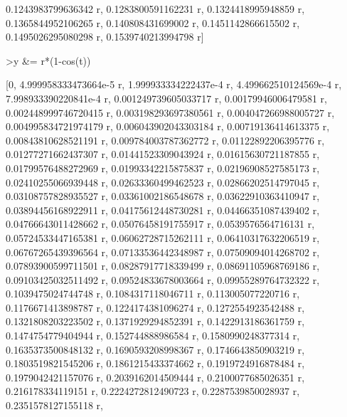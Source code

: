 \documentclass[12pt,arial,letterpaper]{book}
\begin{document}
\begin{eulernootebook}
\begin{eulercomment}
\begin{eulercomment}
\begin{eulernootebook}
\begin{eulercomment}
\begin{eulercomment}
\begin{eulercomment}
\begin{eulercomment}
\begin{eulercomment}
\begin{eulercomment}
\begin{eulernotebook}
\begin{eulercomment}
\begin{eulercomment}
\begin{eulercomment}
\begin{eulercomment}
\begin{eulercomment}
\begin{eulercomment}
\begin{eulercomment}
\begin{eulercomment}
\begin{eulercomment}
\begin{eulercomment}
\begin{eulercomment}
\begin{eulercomment}
\begin{eulercomment}
\begin{eulercomment}
\begin{eulercomment}
\begin{eulercomment}
\begin{euleroutput}
  0.1243983799636342 r, 0.1283800591162231 r, 0.1324418995948859 r, 
  0.1365844952106265 r, 0.140808431699002 r, 0.1451142866615502 r, 
  0.1495026295080298 r, 0.1539740213994798 r]
  
\end{euleroutput}
\begin{eulerprompt}
>y &= r*(1-cos(t))
\end{eulerprompt}
\begin{euleroutput}
  
          [0, 4.999958333473664e-5 r, 1.999933334222437e-4 r, 
  4.499662510124569e-4 r, 7.998933390220841e-4 r, 
  0.001249739605033717 r, 0.00179946006479581 r, 
  0.002448999746720415 r, 0.003198293697380561 r, 
  0.004047266988005727 r, 0.004995834721974179 r, 
  0.006043902043303184 r, 0.00719136414613375 r, 0.00843810628521191 r, 
  0.009784003787362772 r, 0.01122892206395776 r, 0.01277271662437307 r, 
  0.01441523309043924 r, 0.01615630721187855 r, 0.01799576488272969 r, 
  0.01993342215875837 r, 0.02196908527585173 r, 0.02410255066939448 r, 
  0.02633360499462523 r, 0.02866202514797045 r, 0.03108757828935527 r, 
  0.03361002186548678 r, 0.03622910363410947 r, 0.03894456168922911 r, 
  0.04175612448730281 r, 0.04466351087439402 r, 0.04766643011428662 r, 
  0.05076458191755917 r, 0.0539576564716131 r, 0.05724533447165381 r, 
  0.06062728715262111 r, 0.06410317632206519 r, 0.06767265439396564 r, 
  0.07133536442348987 r, 0.07509094014268702 r, 0.07893900599711501 r, 
  0.08287917718339499 r, 0.08691105968769186 r, 0.09103425032511492 r, 
  0.09524833678003664 r, 0.09955289764732322 r, 0.1039475024744748 r, 
  0.1084317118046711 r, 0.113005077220716 r, 0.1176671413898787 r, 
  0.1224174381096274 r, 0.1272554923542488 r, 0.1321808203223502 r, 
  0.1371929294852391 r, 0.1422913186361759 r, 0.1474754779404944 r, 
  0.152744888986584 r, 0.1580990248377314 r, 0.1635373500848132 r, 
  0.1690593208998367 r, 0.1746643850903219 r, 0.1803519821545206 r, 
  0.1861215433374662 r, 0.1919724916878484 r, 0.1979042421157076 r, 
  0.2039162014509444 r, 0.2100077685026351 r, 0.216178334119151 r, 
  0.2224272812490723 r, 0.2287539850028937 r, 0.2351578127155118 r, 

\end{euleroutput}
\end{eulercomment}
\end{eulercomment}
\end{eulercomment}
\end{eulercomment}
\end{eulercomment}
\end{eulercomment}
\end{eulercomment}
\end{eulercomment}
\end{eulercomment}
\end{eulercomment}
\end{eulercomment}
\end{eulercomment}
\end{eulercomment}
\end{eulercomment}
\end{eulercomment}
\end{eulercomment}
\end{eulernotebook}
\end{eulercomment}
\end{eulercomment}
\end{eulercomment}
\end{eulercomment}
\end{eulercomment}
\end{eulercomment}
\end{eulernootebook}
\end{eulercomment}
\end{eulercomment}
\end{eulernootebook}
\end{document}
